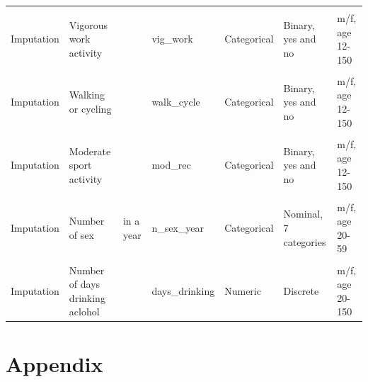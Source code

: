 \documentclass[
]{article}
\begin{document}
\begin{table}[!h]
{\begin{tabular}[t]{lllllll}
\cellcolor{gray!6}{Imputation} & \cellcolor{gray!6}{Diastolic blood pressure} & \cellcolor{gray!6}{2nd reading, in mm Hg} & \cellcolor{gray!6}{bp\_dia2} & \cellcolor{gray!6}{Numeric} & \cellcolor{gray!6}{Discrete} & \cellcolor{gray!6}{m/f, age 8-150}\\
\addlinespace
Imputation & Vigorous work activity &  & vig\_work & Categorical & Binary, yes and no & m/f, age 12-150\\
\cellcolor{gray!6}{Imputation} & \cellcolor{gray!6}{Moderate work activity} & \cellcolor{gray!6}{} & \cellcolor{gray!6}{mod\_work} & \cellcolor{gray!6}{Categorical} & \cellcolor{gray!6}{Binary, yes and no} & \cellcolor{gray!6}{m/f, age 12-150}\\
Imputation & Walking or cycling &  & walk\_cycle & Categorical & Binary, yes and no & m/f, age 12-150\\
\cellcolor{gray!6}{Imputation} & \cellcolor{gray!6}{Vigorous sport activity} & \cellcolor{gray!6}{} & \cellcolor{gray!6}{vig\_rec} & \cellcolor{gray!6}{Categorical} & \cellcolor{gray!6}{Binary, yes and no} & \cellcolor{gray!6}{m/f, age 12-150}\\
Imputation & Moderate sport activity &  & mod\_rec & Categorical & Binary, yes and no & m/f, age 12-150\\
\addlinespace
\cellcolor{gray!6}{Imputation} & \cellcolor{gray!6}{Sedentary activity} & \cellcolor{gray!6}{in minutes} & \cellcolor{gray!6}{time\_sed} & \cellcolor{gray!6}{Numeric} & \cellcolor{gray!6}{Discrete} & \cellcolor{gray!6}{m/f, age 12-150}\\
Imputation & Number of sex & in a year & n\_sex\_year & Categorical & Nominal, 7 categories & m/f, age 20-59\\
\cellcolor{gray!6}{Imputation} & \cellcolor{gray!6}{Frequency of unsafe sex} & \cellcolor{gray!6}{in a year} & \cellcolor{gray!6}{n\_unsafe\_sex\_year} & \cellcolor{gray!6}{Categorical} & \cellcolor{gray!6}{Nominal, 5 categories} & \cellcolor{gray!6}{m/f, age 20-59}\\
Imputation & Number of days drinking aclohol &  & days\_drinking & Numeric & Discrete & m/f, age 20-150\\
\bottomrule
\end{tabular}}
\end{table}

\newpage

\hypertarget{apEDA}{%
\section{Appendix}\label{apEDA}}
\end{document}
